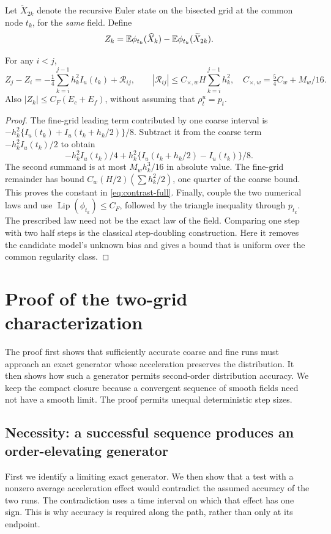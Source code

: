 Let $\widetilde X_{2k}$ denote the recursive Euler state on the bisected grid
at the common node $t_k$, for the \emph{same} field. Define
\[
 Z_k=\mathbb E\phi_{t_k}(\widehat X_k)-\mathbb E\phi_{t_k}(\widetilde X_{2k}).
\]

\begin{lemma}
\label{lem:contrast}
For any $i<j$,
\begin{equation}
 Z_j-Z_i=-\tfrac14\sum_{k=i}^{j-1}h_k^2 I_u(t_k)+\mathcal R_{ij},\qquad
 |\mathcal R_{ij}|\le C_{\times,w}H\sum_{k=i}^{j-1}h_k^2,
 \quad C_{\times,w}=\tfrac54C_w+M_w/16.
 \label{eq:contrast-full}
\end{equation}
Also $|Z_k|\le C_F(E_c+E_f)$, without assuming that $\rho_t^u=p_t$.
\end{lemma}
\begin{proof}
The fine-grid leading term contributed by one coarse interval is
$-h_k^2\{I_u(t_k)+I_u(t_k+h_k/2)\}/8$. Subtract it from the coarse
term $-h_k^2I_u(t_k)/2$ to obtain
\[
 -h_k^2I_u(t_k)/4+
 h_k^2\{I_u(t_k+h_k/2)-I_u(t_k)\}/8.
\]
The second summand is at most $M_wh_k^3/16$ in absolute value.
The fine-grid remainder has bound $C_w(H/2)(\sum h_k^2/2)$, one quarter
of the coarse bound. This proves the constant in
\eqref{eq:contrast-full}. Finally, couple the two numerical laws and use
$\operatorname{Lip}(\phi_{t_k})\le C_F$, followed by the triangle inequality
through $p_{t_k}$. The prescribed law need not be the exact law of the field.
Comparing one step with two half steps is the classical step-doubling
construction. Here it removes the candidate model's unknown bias and gives
a bound that is uniform over the common regularity class.
\end{proof}

\section{Proof of the two-grid characterization}
\label{app:characterization}

The proof first shows that sufficiently accurate coarse and fine runs must
approach an exact generator whose acceleration preserves the distribution.
It then shows how such a generator permits second-order distribution
accuracy. We keep the compact closure because a convergent sequence of
smooth fields need not have a smooth limit. The proof permits unequal
deterministic step sizes.\AIassistance

\subsection{Necessity: a successful sequence produces an order-elevating generator}
First we identify a limiting exact generator. We then show that a test with
a nonzero average acceleration effect would contradict the assumed accuracy
of the two runs. The contradiction uses a time interval on which that effect
has one sign. This is why accuracy is required along the path, rather than
only at its endpoint.

